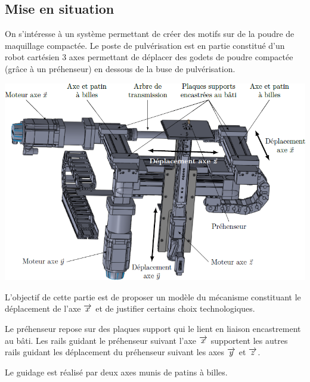 \documentclass[10pt,fleqn]{article} %
\begin{document}

\vspace{4.5cm}
\pagestyle{fancy}
\thispagestyle{plain}


\def\columnseprulecolor{\color{ocre}}
\setlength{\columnseprule}{0.4pt} 

\begin{multicols}{2}
\section*{Mise en situation}
On s'intéresse à un système permettant de créer des motifs sur de la poudre de maquillage compactée. Le poste de pulvérisation est en partie constitué d'un robot cartésien 3 axes permettant de déplacer des godets de poudre compactée (grâce à un préhenseur) en dessous de la buse de pulvérisation. 

\begin{center}
\includegraphics[width=\linewidth]{images/fig_02}
\end{center}
\begin{obj}
L’objectif de cette partie est de proposer un modèle du mécanisme constituant le déplacement de l’axe $\overrightarrow{x}$ et de justifier certains choix technologiques.
\end{obj}

Le préhenseur repose sur des plaques support qui le lient en liaison encastrement au bâti. Les rails
guidant le préhenseur suivant l’axe $\overrightarrow{x}$ supportent les autres rails guidant les déplacement du préhenseur suivant les axes $\overrightarrow{y}$ et $\overrightarrow{z}$.

Le guidage est réalisé par deux axes munis de patins à billes.


\end{multicols}
\end{document}
